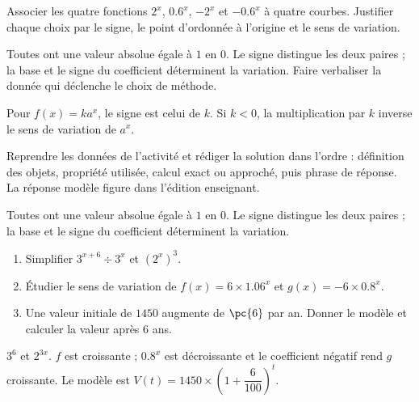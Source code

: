 \begin{activity}
Associer les quatre fonctions $2^x$, $\num{0,6}^x$, $-2^x$ et $-\num{0,6}^x$ à quatre courbes. Justifier chaque choix par le signe, le point d'ordonnée à l'origine et le sens de variation.
\begin{center}\end{center}
\end{activity}
\begin{solution}Toutes ont une valeur absolue égale à $1$ en $0$. Le signe distingue les deux paires ; la base et le signe du coefficient déterminent la variation. Faire verbaliser la donnée qui déclenche le choix de méthode.\end{solution}

\begin{summary}Pour $f(x)=ka^x$, le signe est celui de $k$. Si $k<0$, la multiplication par $k$ inverse le sens de variation de $a^x$.\end{summary}

\begin{example}
Reprendre les données de l'activité et rédiger la solution dans l'ordre : définition des objets, propriété utilisée, calcul exact ou approché, puis phrase de réponse. La réponse modèle figure dans l'édition enseignant.
\end{example}
\begin{solution}Toutes ont une valeur absolue égale à $1$ en $0$. Le signe distingue les deux paires ; la base et le signe du coefficient déterminent la variation.\end{solution}

\begin{exercise}[essentiel]
\begin{enumerate}\item Simplifier $3^{x+6}\div3^x$ et $(2^x)^3$.\item Étudier le sens de variation de $f(x)=6\times\num{1,06}^x$ et $g(x)=-6\times\num{0,8}^x$.\item Une valeur initiale de $1450$ augmente de $\pc{6}$ par an. Donner le modèle et calculer la valeur après $6$ ans.\end{enumerate}
\end{exercise}
\begin{solution}$3^6$ et $2^{3x}$. $f$ est croissante ; $\num{0,8}^x$ est décroissante et le coefficient négatif rend $g$ croissante. Le modèle est $V(t)=1450\times\left(1+\dfrac{6}{100}\right)^t$.\end{solution}

